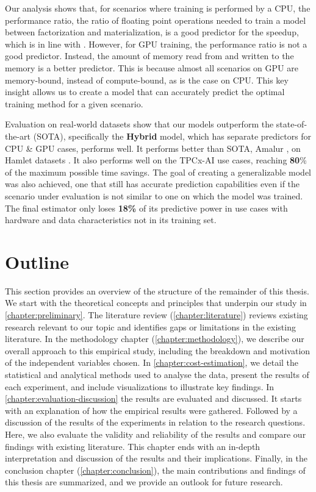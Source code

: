 Our analysis shows that, for scenarios where training is performed by a CPU, the performance ratio, the ratio of floating point operations needed to train a model between factorization and materialization, is a good predictor for the speedup, which is in line with \cite{amalur}. However, for GPU training, the performance ratio is not a good predictor. Instead, the amount of memory read from and written to the memory is a better predictor. This is because almost all scenarios on GPU are memory-bound, instead of compute-bound, as is the case on CPU. This key insight allows us to create a model that can accurately predict the optimal training method for a given scenario.

Evaluation on real-world datasets show that our models outperform the state-of-the-art (SOTA), specifically the \textbf{Hybrid} model, which has separate predictors for CPU \& GPU cases, performs well. It performs better than SOTA, Amalur \cite{schijndel_cost_estimation}, on Hamlet datasets \cite{2016-hamlet-sigmod}. It also performs well on the TPCx-AI use cases, reaching \textbf{80}\% of the maximum possible time savings. The goal of creating a generalizable model was also achieved, one that still has accurate prediction capabilities even if the scenario under evaluation is not similar to one on which the model was trained. The final estimator only loses \textbf{18\%} of its predictive power in use cases with hardware and data characteristics not in its training set.

\section{Outline}
This section provides an overview of the structure of the remainder of this thesis. We start with the theoretical concepts and principles that underpin our study in \autoref{chapter:preliminary}. The literature review (\autoref{chapter:literature}) reviews existing research relevant to our topic and identifies gaps or limitations in the existing literature. In the methodology chapter (\autoref{chapter:methodology}), we describe our overall approach to this empirical study, including the breakdown and motivation of the independent variables chosen.  In \autoref{chapter:cost-estimation}, we detail the statistical and analytical methods used to analyse the data, present the results of each experiment, and include visualizations to illustrate key findings. In \autoref{chapter:evaluation-discussion} the results are evaluated and discussed. It starts with an explanation of how the empirical results were gathered. Followed by a discussion of the results of the experiments in relation to the research questions. Here, we also evaluate the validity and reliability of the results and compare our findings with existing literature. This chapter ends with an in-depth interpretation and discussion of the results and their implications.  Finally, in the conclusion chapter (\autoref{chapter:conclusion}), the main contributions and findings of this thesis are summarized, and we provide an outlook for future research.

